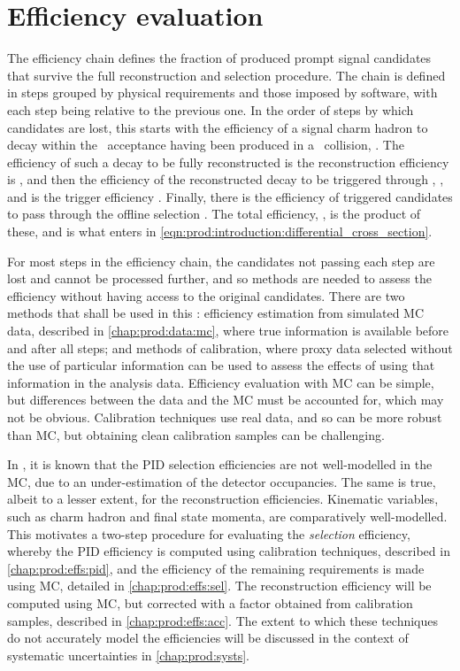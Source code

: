 \chapter{Efficiency evaluation}
\label{chap:prod:effs}

The efficiency chain defines the fraction of produced prompt signal candidates 
that survive the full reconstruction and selection procedure.
The chain is defined in steps grouped by physical requirements and those 
imposed by software, with each step being relative to the previous one.
In the order of steps by which candidates are lost, this starts with the efficiency of a signal charm hadron to decay within the 
\lhcb\ acceptance having been produced in a \pp\ collision, \effacc.
The efficiency of such a decay to be fully reconstructed is the reconstruction 
efficiency is \effreco, and then the efficiency of the reconstructed decay to 
be triggered through \lzero, \hltone, and \hlttwo is the trigger efficiency 
\efftrig.
Finally, there is the efficiency of triggered candidates to pass through the 
offline selection \effoffline.
The total efficiency, \eff, is the product of these, and is what enters in 
\cref{eqn:prod:introduction:differential_cross_section}.

For most steps in the efficiency chain, the candidates not passing each step 
are lost and cannot be processed further, and so methods are needed to assess the 
efficiency without having access to the original candidates.
There are two methods that shall be used in this : 
efficiency estimation from simulated \acf{MC} data, described in 
\cref{chap:prod:data:mc}, where true information is available before and after 
all steps; and methods of calibration, where proxy data selected without the 
use of particular information can be used to assess the effects of using that information in the 
analysis data.
Efficiency evaluation with \ac{MC} can be simple, but differences between the 
data and the \ac{MC} must be accounted for, which may not be obvious.
Calibration techniques use real data, and so can be more robust than \ac{MC}, 
but obtaining clean calibration samples can be challenging.

In \lhcb, it is known that the \ac{PID} selection efficiencies are not 
well-modelled in the \ac{MC}, due to an under-estimation of the detector 
occupancies.
The same is true, albeit to a lesser extent, for the reconstruction 
efficiencies.
Kinematic variables, such as charm hadron and final state momenta, are 
comparatively well-modelled.
This motivates a two-step procedure for evaluating the \emph{selection} 
efficiency, whereby the \ac{PID} efficiency is computed using calibration 
techniques, described in \cref{chap:prod:effs:pid}, and the efficiency of the remaining 
requirements is made using \ac{MC}, detailed in \cref{chap:prod:effs:sel}.
The reconstruction efficiency will be computed using \ac{MC}, but corrected 
with a factor obtained from calibration samples, described in \cref{chap:prod:effs:acc}.
The extent to which these techniques do not accurately model the efficiencies 
will be discussed in the context of systematic uncertainties in 
\cref{chap:prod:systs}.

